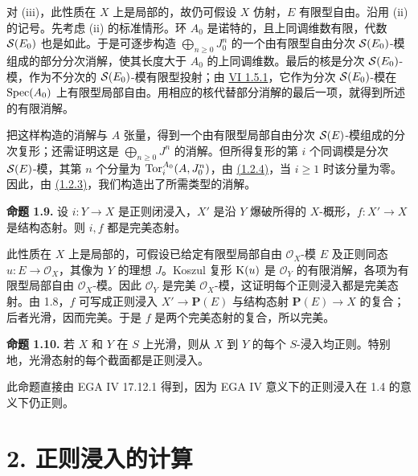 对 (iii)，此性质在 \(X\) 上是局部的，故仍可假设 \(X\) 仿射，\(E\) 有限型自由。沿用 (ii) 的记号。先考虑 (ii) 的标准情形。环 \(A_0\) 是诺特的，且上同调维数有限，代数 \(\mathcal S(E_0)\) 也是如此。于是可逐步构造 \(\bigoplus_{n\ge0}J_0^n\) 的一个由有限型自由分次 \(\mathcal S(E_0)\)-模组成的部分分次消解，使其长度大于 \(A_0\) 的上同调维数。最后的核是分次 \(\mathcal S(E_0)\)-模，作为不分次的 \(\mathcal S(E_0)\)-模有限型投射；由 \hyperlink{sga6.e06.lem.1-5-1}{VI 1.5.1}，它作为分次 \(\mathcal S(E_0)\)-模在 \(\operatorname{Spec}(A_0)\) 上有限型局部自由。用相应的核代替部分消解的最后一项，就得到所述的有限消解。

把这样构造的消解与 \(A\) 张量，得到一个由有限型局部自由分次 \(\mathcal S(E)\)-模组成的分次复形；还需证明这是 \(\bigoplus_{n\ge0}J^n\) 的消解。但所得复形的第 \(i\) 个同调模是分次 \(\mathcal S(E)\)-模，其第 \(n\) 个分量为 \(\operatorname{Tor}_i^{A_0}(A,J_0^n)\)，由 \hyperlink{sga6.e07.eq.1-2-4}{(1.2.4)}，当 \(i\ge1\) 时该分量为零。因此，由 \hyperlink{sga6.e07.eq.1-2-3}{(1.2.3)}，我们构造出了所需类型的消解。

\textbf{命题 1.9.} 设 \(i:Y\to X\) 是正则闭浸入，\(X'\) 是沿 \(Y\) 爆破所得的 \(X\)-概形，\(f:X'\to X\) 是结构态射。则 \(i,f\) 都是完美态射。

此性质在 \(X\) 上是局部的，可假设已给定有限型局部自由 \(\mathcal O_X\)-模 \(E\) 及正则同态 \(u:E\to\mathcal O_X\)，其像为 \(Y\) 的理想 \(J\)。Koszul 复形 \(\mathrm K(u)\) 是 \(\mathcal O_Y\) 的有限消解，各项为有限型局部自由 \(\mathcal O_X\)-模。因此 \(\mathcal O_Y\) 是完美 \(\mathcal O_X\)-模，这证明每个正则浸入都是完美态射。由 1.8，\(f\) 可写成正则浸入 \(X'\to\mathbf P(E)\) 与结构态射 \(\mathbf P(E)\to X\) 的复合；后者光滑，因而完美。于是 \(f\) 是两个完美态射的复合，所以完美。

\textbf{命题 1.10.} 若 \(X\) 和 \(Y\) 在 \(S\) 上光滑，则从 \(X\) 到 \(Y\) 的每个 \(S\)-浸入均正则。特别地，光滑态射的每个截面都是正则浸入。

此命题直接由 EGA IV 17.12.1 得到，因为 EGA IV 意义下的正则浸入在 1.4 的意义下仍正则。

\section*{2. 正则浸入的计算}

